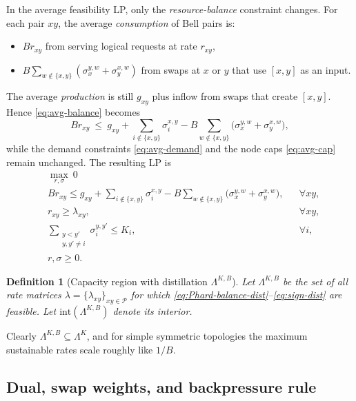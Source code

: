 \documentclass[11pt]{article}
\newtheorem{definition}{Definition}
\newcommand{\Pairs}{\mathcal{P}} %
\begin{document}
In the average feasibility LP, only the \emph{resource-balance}
constraint changes. For each pair $xy$, the average \emph{consumption}
of Bell pairs is:
\begin{itemize}[leftmargin=2em]
\item $B r_{xy}$ from serving logical requests at rate $r_{xy}$,
\item $B\sum_{w\notin\{x,y\}}(\sigma_x^{y,w}+\sigma_y^{x,w})$ from
swaps at $x$ or $y$ that use $[x,y]$ as an input.
\end{itemize}
The average \emph{production} is still $g_{xy}$ plus inflow from swaps
that create $[x,y]$. Hence \eqref{eq:avg-balance} becomes
\begin{equation}
B r_{xy}
\ \le\
g_{xy}
+\sum_{i\notin\{x,y\}}\sigma_i^{x,y}
- B\sum_{w\notin\{x,y\}}
\big(\sigma_x^{y,w}+\sigma_y^{x,w}\big),
\label{eq:avg-balance-dist}
\end{equation}
while the demand constraints \eqref{eq:avg-demand} and the node caps
\eqref{eq:avg-cap} remain unchanged. The resulting LP is
\begin{align}
&\max_{r,\sigma}  \ 0 && \\
& B r_{xy} \le g_{xy}
+\sum_{i\notin\{x,y\}}\sigma_i^{x,y}
- B\sum_{w\notin\{x,y\}}\big(\sigma_x^{y,w}+\sigma_y^{x,w}\big),
&& \forall xy,
\label{eq:Phard-balance-dist}\\
&r_{xy} \ge \lambda_{xy}, && \forall xy,
\label{eq:Phard-demand-dist}\\
&\sum_{\substack{y<y'\\ y,y'\neq i}}\sigma_i^{y,y'} \le K_i,
&& \forall i,
\label{eq:Phard-cap-dist}\\
&r,\sigma \ge 0. \label{eq:sign-dist}
\end{align}

\begin{definition}[Capacity region with distillation $\Lambda^{K,B}$]
Let $\Lambda^{K,B}$ be the set of all rate matrices
$\lambda=\{\lambda_{xy}\}_{xy\in\Pairs}$ for which
\eqref{eq:Phard-balance-dist}--\eqref{eq:sign-dist} are feasible. Let
$\mathrm{int}(\Lambda^{K,B})$ denote its interior.
\end{definition}

Clearly $\Lambda^{K,B}\subseteq\Lambda^K$, and for simple symmetric
topologies the maximum sustainable rates scale roughly like $1/B$.

\subsection{Dual, swap weights, and backpressure rule}
\end{document}
